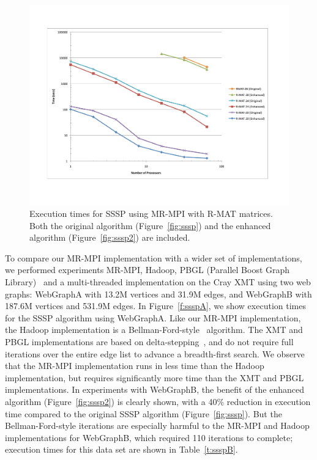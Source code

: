 \begin{figure}[htb]
\includegraphics[width=\textwidth]{fig_sssp.pdf}
\caption{Execution times for SSSP using MR-MPI with R-MAT matrices.  
Both the original algorithm (Figure~\ref{fig:sssp}) and the enhanced 
algorithm (Figure~\ref{fig:sssp2}) are included.}
\label{f:sssp}
\end{figure}

To compare our MR-MPI implementation with a wider set of implementations,
we performed experiments MR-MPI, Hadoop, PBGL (Parallel
Boost Graph Library)~\cite{PBGL} and a multi-threaded implementation on the
Cray XMT using two web graphs: {WebGraphA} with 13.2M
vertices and 31.9M edges, and {WebGraphB} with 187.6M vertices and 531.9M edges.
In Figure~\ref{f:ssspA}, we show execution times for the SSSP algorithm
using {WebGraphA}.   Like our MR-MPI implementation, the Hadoop 
implementation is a Bellman-Ford-style~\cite{Bellman58,Ford62}  algorithm.  
The XMT and PBGL implementations are based on 
delta-stepping~\cite{MeyerSanders98}, and do not require full iterations
over the entire edge list to advance a breadth-first search.  
We observe that the MR-MPI
implementation runs in less time than the Hadoop implementation, but requires
significantly more time than the XMT and PBGL implementations.  
In experiments with {WebGraphB},
the benefit of the enhanced algorithm (Figure~\ref{fig:sssp2}) is clearly
shown, with a 40\% reduction in execution time compared to the original
SSSP algorithm (Figure~\ref{fig:sssp}).
But the Bellman-Ford-style iterations are especially harmful to the MR-MPI and
Hadoop implementations for {WebGraphB}, which required 110 iterations to 
complete; execution times for this data set are shown in Table~\ref{t:ssspB}.

